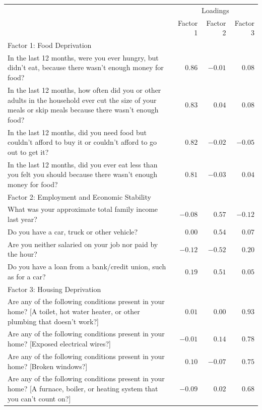 \documentclass[
]{article}
\begin{document}
\begin{table}

\caption{\label{tbl-exp1-pca}Results from a Factor Analysis of our
deprivation questionnaire}\begin{minipage}[t]{\linewidth}

{\centering 

\begin{longtable}{lrrr}
\tabularnewline

\toprule
 & \multicolumn{3}{c}{Loadings} \\ 
\cmidrule(lr){2-4}
 & Factor 1 & Factor 2 & Factor 3 \\ 
\midrule
\multicolumn{4}{l}{Factor 1: Food Deprivation} \\ 
\midrule
In the last 12 months, were you ever hungry, but didn't eat, because there wasn't enough money for food? & $0.86$ & $-0.01$ & $0.08$ \\ 
In the last 12 months, how often did you or other adults in the household ever cut the size of your 
meals or skip meals because there wasn't enough food? & $0.83$ & $0.04$ & $0.08$ \\ 
In the last 12 months, did you need food but couldn't afford to buy it or couldn't afford to go out to get it? & $0.82$ & $-0.02$ & $-0.05$ \\ 
In the last 12 months, did you ever eat less than you felt you should because there wasn't 
enough money for food? & $0.81$ & $-0.03$ & $0.04$ \\ 
\midrule
\multicolumn{4}{l}{Factor 2: Employment and Economic Stability} \\ 
\midrule
What was your approximate total family income last year? & $-0.08$ & $0.57$ & $-0.12$ \\ 
Do you have a car, truck or other vehicle? & $0.00$ & $0.54$ & $0.07$ \\ 
Are you neither salaried on your job nor paid by the hour? & $-0.12$ & $-0.52$ & $0.20$ \\ 
Do you have a loan from a bank/credit union, such as for a car? & $0.19$ & $0.51$ & $0.05$ \\ 
\midrule
\multicolumn{4}{l}{Factor 3: Housing Deprivation} \\ 
\midrule
Are any of the following conditions present in your home? [A toilet, hot water heater, or other plumbing that doesn't work?] & $0.01$ & $0.00$ & $0.93$ \\ 
Are any of the following conditions present in your home? [Exposed electrical wires?] & $-0.01$ & $0.14$ & $0.78$ \\ 
Are any of the following conditions present in your home? [Broken windows?] & $0.10$ & $-0.07$ & $0.75$ \\ 
Are any of the following conditions present in your home? [A furnace, boiler, or heating system that you can't count on?] & $-0.09$ & $0.02$ & $0.68$ \\ 
\bottomrule
\end{longtable}

}
\end{minipage}
\end{table}
\end{document}
